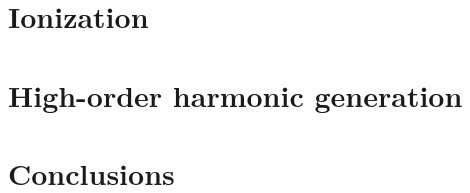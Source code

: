 \documentclass[pdftex,11pt,twoside,
%
%
a4paper]{report}
\numberwithin{equation}{chapter}       %
\theoremstyle{named}
\begin{document}
\setcounter{page}{1}    %

\newpage 

\newpage













\singlespacing
%


\newpage
\singlespacing
\tableofcontents  

\newpage
\listoffigures

\listofmathaside



\singlespacing
%





\onehalfspacing

\makeatletter
\@openrighttrue
\makeatother








%

%
\part{Ionization}
\label{part:I}








\part{High-order harmonic generation}
\label{part:II}





\part{Conclusions}
\label{part:III}
\end{document}
